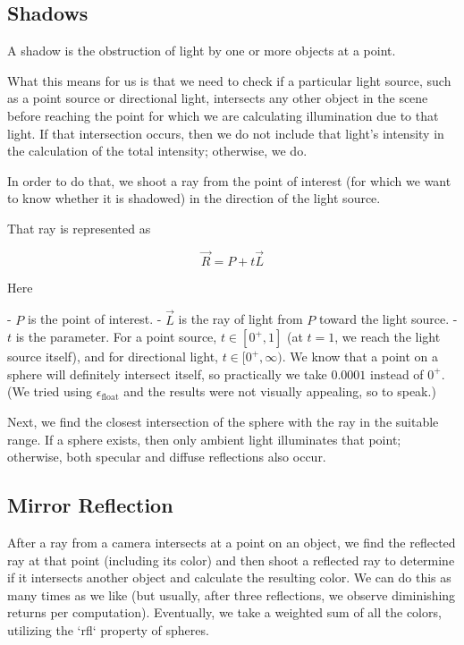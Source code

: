 \documentclass[conference]{IEEEtran}
\begin{document}
\subsection{Shadows }

A shadow is the obstruction of light by one or more objects at a point.

What this means for us is that we need to check if a particular light source, such as a point source or directional light, intersects any other object in the scene before reaching the point for which we are calculating illumination due to that light. If that intersection occurs, then we do not include that light's intensity in the calculation of the total intensity; otherwise, we do.

In order to do that, we shoot a ray from the point of interest (for which we want to know whether it is shadowed) in the direction of the light source.

That ray is represented as 

$$\vec{R} = P + t \vec{L}$$

Here

- $P$ is the point of interest.
- $\vec{L}$ is the ray of light from $P$ toward the light source.
- $t$ is the parameter. For a point source, $t \in [0^+, 1]$ (at $t = 1$, we reach the light source itself), and for directional light, $t \in [0^+, \infty)$. We know that a point on a sphere will definitely intersect itself, so practically we take $0.0001$ instead of $0^+$. (We tried using $\epsilon_{\text{float}}$ and the results were not visually appealing, so to speak.)

Next, we find the closest intersection of the sphere with the ray in the suitable range. If a sphere exists, then only ambient light illuminates that point; otherwise, both specular and diffuse reflections also occur.

\subsection{Mirror Reflection}

After a ray from a camera intersects at a point on an object, we find the reflected ray at that point (including its color) and then shoot a reflected ray to determine if it intersects another object and calculate the resulting color. We can do this as many times as we like (but usually, after three reflections, we observe diminishing returns per computation). Eventually, we take a weighted sum of all the colors, utilizing the `rfl` property of spheres.
\end{document}
